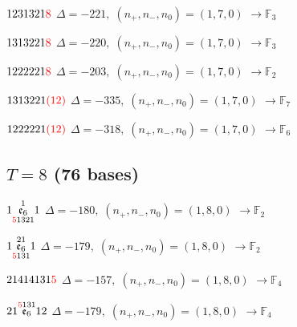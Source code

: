 \documentclass[10pt]{article}
\begin{document}
\smallskip

$1231321\textcolor{red}{8}$ \quad $\Delta=-221,\; (n_+,n_-,n_0)=(1,7,0)$ \quad $\to \mathbb{F}_{3}$

\smallskip

$1313221\textcolor{red}{8}$ \quad $\Delta=-220,\; (n_+,n_-,n_0)=(1,7,0)$ \quad $\to \mathbb{F}_{3}$

\smallskip

$1222221\textcolor{red}{8}$ \quad $\Delta=-203,\; (n_+,n_-,n_0)=(1,7,0)$ \quad $\to \mathbb{F}_{2}$

\smallskip

$1313221\textcolor{red}{(12)}$ \quad $\Delta=-335,\; (n_+,n_-,n_0)=(1,7,0)$ \quad $\to \mathbb{F}_{7}$

\smallskip

$1222221\textcolor{red}{(12)}$ \quad $\Delta=-318,\; (n_+,n_-,n_0)=(1,7,0)$ \quad $\to \mathbb{F}_{6}$


\subsection*{$T = 8$ \quad (76 bases)}
\smallskip

$1\overset{1}{\underset{\textcolor{red}{5}1321}{\mathfrak{e}_6}}1$ \quad $\Delta=-180,\; (n_+,n_-,n_0)=(1,8,0)$ \quad $\to \mathbb{F}_{2}$

\smallskip

$1\overset{21}{\underset{\textcolor{red}{5}131}{\mathfrak{e}_6}}1$ \quad $\Delta=-179,\; (n_+,n_-,n_0)=(1,8,0)$ \quad $\to \mathbb{F}_{2}$

\smallskip

$21414131\textcolor{red}{5}$ \quad $\Delta=-157,\; (n_+,n_-,n_0)=(1,8,0)$ \quad $\to \mathbb{F}_{4}$

\smallskip

$21\overset{\textcolor{red}{5}131}{\mathfrak{e}_6}12$ \quad $\Delta=-179,\; (n_+,n_-,n_0)=(1,8,0)$ \quad $\to \mathbb{F}_{4}$

\smallskip
\end{document}
